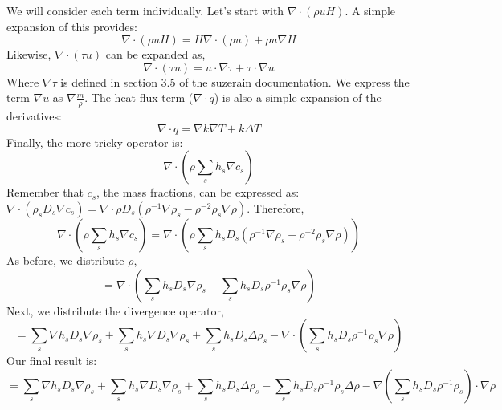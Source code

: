 \documentclass[10pt]{article}
\begin{document}
We will consider each term individually. Let's start with $\nabla \cdot (\rho u H)$. A simple expansion of this provides:
\begin{equation}
  \nabla \cdot (\rho u H) = H \nabla \cdot (\rho u) + \rho u \nabla H 
\end{equation}
Likewise, $\nabla \cdot (\tau u)$ can be expanded as,
\begin{equation}
 \nabla \cdot (\tau u) = u \cdot \nabla \tau + \tau \cdot \nabla u 
\end{equation}
Where $\nabla \tau$ is defined in section 3.5 of the suzerain
documentation. We express the term $\nabla u$ as $\nabla
\frac{m}{\rho}$. 
\newline
\newline
The heat flux term ($\nabla \cdot q$) is also a simple expansion of the derivatives:
\begin{equation}
  \nabla \cdot q = \nabla k \nabla T + k \Delta T
\end{equation}
Finally, the more tricky operator is:
\begin{equation}
  \nabla \cdot (\rho \sum_s h_s \nabla c_s)
\end{equation}
Remember that $c_s$, the mass fractions, can be expressed as: $\nabla \cdot (\rho_s D_s \nabla c_s) = \nabla \cdot \rho D_s (\rho^{-1} \nabla \rho_s - \rho^{-2} \rho_s \nabla \rho)$. 
Therefore, 
\begin{equation}
  \nabla \cdot (\rho \sum_s h_s \nabla c_s) = \nabla \cdot (\rho \sum_s h_s D_s ( \rho^{-1} \nabla \rho_s - \rho^{-2} \rho_s \nabla \rho))
\end{equation}
As before, we distribute $\rho$,
\begin{equation}
  = \nabla \cdot (\sum_s h_s D_s \nabla \rho_s - \sum_s h_s D_s \rho^{-1} \rho_s \nabla \rho)
\end{equation}
Next, we distribute the divergence operator,
\begin{equation}
  = \sum_s \nabla h_s D_s \nabla \rho_s + \sum_s h_s \nabla D_s \nabla \rho_s + \sum_s h_s D_s \Delta \rho_s - \nabla \cdot (\sum_s h_s D_s \rho^{-1} \rho_s \nabla \rho)
\end{equation}
Our final result is:
\begin{equation}
  = \sum_s \nabla h_s D_s \nabla \rho_s + \sum_s h_s \nabla D_s \nabla \rho_s + \sum_s h_s D_s \Delta \rho_s - \sum_s h_s D_s \rho^{-1} \rho_s \Delta \rho - \nabla (\sum_s h_s D_s \rho^{-1} \rho_s) \cdot \nabla \rho 
\end{equation}
\end{document}
